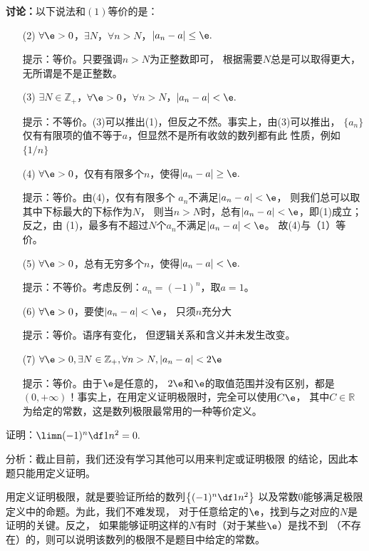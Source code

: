 {\bf 讨论：}以下说法和$(1)$等价的是：
\begin{enumerate}
  \setlength{\itemindent}{1cm}
  \item[(2)] $\forall\e>0$，$\exists N$，$\forall
  n>N$，$|a_n-a|\leq\e.$ 
  
  \ifhint\quad 提示：等价。只要强调$n>N$为正整数即可，
  根据需要$N$总是可以取得更大，无所谓是不是正整数。\fi

  \item[(3)] $\exists N\in\mathbb{Z}_+$，$\forall\e>0$，$\forall
  n>N$，$|a_n-a|<\e.$ 
  
  \ifhint\quad 提示：不等价。(3)可以推出(1)，但反之不然。事实上，由(3)可以推出，
  $\{a_n\}$仅有有限项的值不等于$a$，但显然不是所有收敛的数列都有此
  性质，例如$\{1/n\}$\fi

  \item[(4)] $\forall\e>0$，仅有有限多个$n$，使得$|a_n-a|\geq\e.$
  
  \ifhint\quad 提示：等价。由(4)，仅有有限多个
  $a_n$不满足$|a_n-a|<\e$，
  则我们总可以取其中下标最大的下标作为$N$，
  则当$n>N$时，总有$|a_n-a|<\e$，即(1)成立；反之，由
  (1)，最多有不超过$N$个$a_n$不满足$|a_n-a|<\e$。
  故(4)与（1）等价。\fi
  
  \item[(5)] $\forall\e>0$，总有无穷多个$n$，使得$|a_n-a|<\e.$
  
  \ifhint\quad 提示：不等价。考虑反例：$a_n=(-1)^n$，取$a=1$。\fi

  \item[(6)] $\forall\e>0$，要使$|a_n-a|<\e$，
  只须$n$充分大
  
  \ifhint\quad 提示：等价。语序有变化，
  但逻辑关系和含义并未发生改变。\fi

  \item[(7)] $\forall\e>0,\exists N\in\mathbb{Z}_+,\forall
  n>N,|a_n-a|<2\e$

  \ifhint\quad 提示：等价。由于$\e$是任意的，
  $2\e$和$\e$的取值范围并没有区别，都是
  $(0,+\infty)$！事实上，在用定义证明极限时，完全可以使用$C\e$，
  其中$C\in\mathbb{R}$为给定的常数，这是数列极限最常用的一种等价定义。\fi
\end{enumerate}

\bs
\egz 证明：$\limn(-1)^n\df1{n^2}=0.$

分析：截止目前，我们还没有学习其他可以用来判定或证明极限
的结论，因此本题只能用定义证明。

用定义证明极限，就是要验证所给的数列$\left\{(-1)^n\df1{n^2}\right\}$
以及常数$0$能够满足极限定义中的命题。为此，我们不难发现，
对于任意给定的$\e$，找到与之对应的$N$是证明的关键。反之，
如果能够证明这样的$N$有时（对于某些$\e$）是找不到
（不存在）的，则可以说明该数列的极限不是题目中给定的常数。

